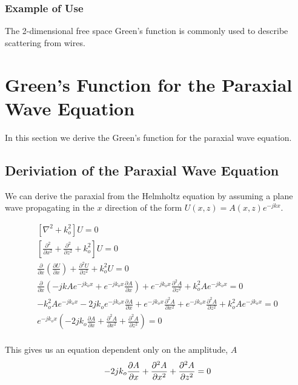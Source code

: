 \subsubsection{Example of Use}
The 2-dimensional free space Green's function is commonly used to describe scattering from wires.

\section{Green's Function for the Paraxial Wave Equation} \label{gf_sec:paraxial}
In this section we derive the Green's function for the paraxial wave equation.

\subsection{Deriviation of the Paraxial Wave Equation}
We can derive the paraxial from the Helmholtz equation by assuming a plane wave propagating in the $x$ direction of the form $U(x,z) = A(x,z)e^{-jkx}$.

 \begin{equation}
 \begin{gathered}
 \left[ \nabla^2 + k_o^2\right]U = 0 \\
\left[\frac{\partial^2 }{\partial x^2} + \frac{\partial^2 }{\partial z^2} + k_o^2\right]U = 0 \\
\frac{\partial }{\partial x}\left(\frac{\partial U}{\partial x} \right) + \frac{\partial^2 U}{\partial z^2} + k_o^2 U = 0 \\
\frac{\partial }{\partial x}\left(-jkAe^{-jk_ox}+e^{-jk_ox}\frac{\partial A}{\partial x} \right) + e^{-jk_ox}\frac{\partial^2 A}{\partial z^2} + k_o^2 Ae^{-jk_ox} = 0 \\
-k_o^2Ae^{-jk_ox} -2jk_oe^{-jk_ox}\frac{\partial A}{\partial x}+e^{-jk_ox}\frac{\partial^2 A}{\partial x^2} + e^{-jk_ox}\frac{\partial^2 A}{\partial z^2} + k_o^2 Ae^{-jk_ox} = 0 \\
e^{-jk_ox}\left( -2jk_o\frac{\partial A}{\partial x}+\frac{\partial^2 A}{\partial x^2} + \frac{\partial^2 A}{\partial z^2}\right) = 0 \\
\end{gathered}
\label{gf_eq:41}
\end{equation}
 \renewcommand{\baselinestretch}{2} \small\normalsize
 
This gives us an equation dependent only on the amplitude, $A$
 \begin{equation}
-2jk_o\frac{\partial A}{\partial x}+\frac{\partial^2 A}{\partial x^2} + \frac{\partial^2 A}{\partial z^2} = 0 \\
\label{gf_eq:42}
\end{equation}
 \renewcommand{\baselinestretch}{2} \small\normalsize
 
